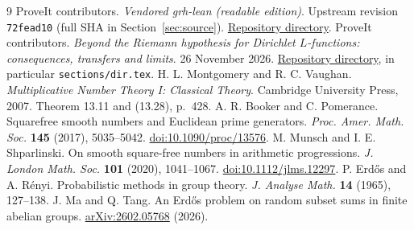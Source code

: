 \documentclass[11pt]{article}
\theoremstyle{definition}\newtheorem{remark}[theorem]{Remark}
\begin{document}
\begin{thebibliography}{9}\small
{} ProveIt contributors. \emph{Vendored grh-lean (readable edition)}. Upstream revision \texttt{72fead10} (full SHA in Section~\ref{sec:source}). \href{https://github.com/VladimirReshetnikov/ProveIt/tree/main/Analysis/GeneralizedRiemannHypothesis/vendor/grh-lean}{Repository directory}.
 ProveIt contributors. \emph{Beyond the Riemann hypothesis for Dirichlet $L$-functions: consequences, transfers and limits}. 26 November 2026. \href{https://github.com/VladimirReshetnikov/ProveIt/tree/main/Analysis/GeneralizedRiemannHypothesis/Article}{Repository directory}, in particular \texttt{sections/dir.tex}.
 H. L. Montgomery and R. C. Vaughan. \emph{Multiplicative Number Theory I: Classical Theory}. Cambridge University Press, 2007. Theorem 13.11 and (13.28), p.~428.
 A. R. Booker and C. Pomerance. Squarefree smooth numbers and Euclidean prime generators. \emph{Proc. Amer. Math. Soc.} \textbf{145} (2017), 5035--5042. \href{https://doi.org/10.1090/proc/13576}{doi:10.1090/proc/13576}.
 M. Munsch and I. E. Shparlinski. On smooth square-free numbers in arithmetic progressions. \emph{J. London Math. Soc.} \textbf{101} (2020), 1041--1067. \href{https://doi.org/10.1112/jlms.12297}{doi:10.1112/jlms.12297}.
 P. Erd\H{o}s and A. R\'enyi. Probabilistic methods in group theory. \emph{J. Analyse Math.} \textbf{14} (1965), 127--138.
 J. Ma and Q. Tang. An Erd\H{o}s problem on random subset sums in finite abelian groups. \href{https://arxiv.org/abs/2602.05768}{arXiv:2602.05768} (2026).
\end{thebibliography}
\end{document}
